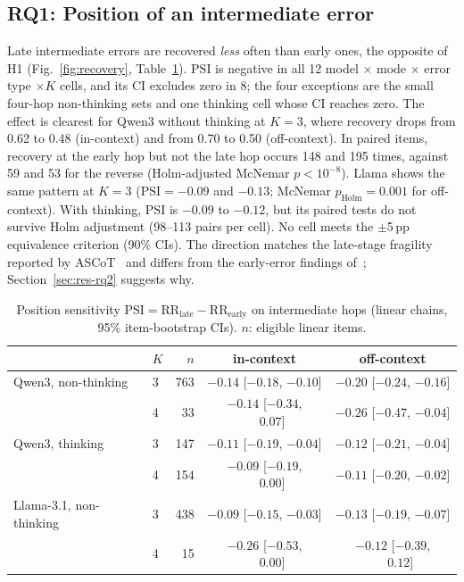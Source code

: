 \documentclass[conference]{IEEEtran}
\newcommand{\RR}{\mathrm{RR}}
\newcommand{\PSI}{\mathrm{PSI}}
\begin{document}
\subsection{RQ1: Position of an intermediate error}
Late intermediate errors are recovered \emph{less} often than early ones, the opposite of H1 (Fig.~\ref{fig:recovery}, Table~\ref{tab:psi}). $\PSI$ is negative in all 12 model $\times$ mode $\times$ error type $\times K$ cells, and its CI excludes zero in 8; the four exceptions are the small four-hop non-thinking sets and one thinking cell whose CI reaches zero. The effect is clearest for Qwen3 without thinking at $K{=}3$, where recovery drops from 0.62 to 0.48 (in-context) and from 0.70 to 0.50 (off-context). In paired items, recovery at the early hop but not the late hop occurs 148 and 195 times, against 59 and 53 for the reverse (Holm-adjusted McNemar $p<10^{-8}$). Llama shows the same pattern at $K{=}3$ ($\PSI=-0.09$ and $-0.13$; McNemar $p_\text{Holm}=0.001$ for off-context). With thinking, $\PSI$ is $-0.09$ to $-0.12$, but its paired tests do not survive Holm adjustment (98--113 pairs per cell). No cell meets the $\pm$5\,pp equivalence criterion (90\% CIs). The direction matches the late-stage fragility reported by ASCoT~\cite{ascot} and differs from the early-error findings of~\cite{vonrecum,jiamu}; Section~\ref{sec:res-rq2} suggests why.

\begin{table}[t]
\centering
\caption{Position sensitivity $\PSI=\RR_\text{late}-\RR_\text{early}$ on intermediate hops (linear chains, 95\% item-bootstrap CIs). $n$: eligible linear items.}
\label{tab:psi}
\small
\setlength{\tabcolsep}{4pt}
\begin{tabular}{llrcc}
\toprule
 & $K$ & $n$ & in-context & off-context \\
\midrule
Qwen3, non-thinking & 3 & 763 & $-0.14$ [$-0.18$, $-0.10$] & $-0.20$ [$-0.24$, $-0.16$] \\
 & 4 & 33 & $-0.14$ [$-0.34$, $\phantom{-}0.07$] & $-0.26$ [$-0.47$, $-0.04$] \\
Qwen3, thinking & 3 & 147 & $-0.11$ [$-0.19$, $-0.04$] & $-0.12$ [$-0.21$, $-0.04$] \\
 & 4 & 154 & $-0.09$ [$-0.19$, $\phantom{-}0.00$] & $-0.11$ [$-0.20$, $-0.02$] \\
Llama-3.1, non-thinking & 3 & 438 & $-0.09$ [$-0.15$, $-0.03$] & $-0.13$ [$-0.19$, $-0.07$] \\
 & 4 & 15 & $-0.26$ [$-0.53$, $\phantom{-}0.00$] & $-0.12$ [$-0.39$, $\phantom{-}0.12$] \\
\bottomrule
\end{tabular}
\end{table}
\end{document}
